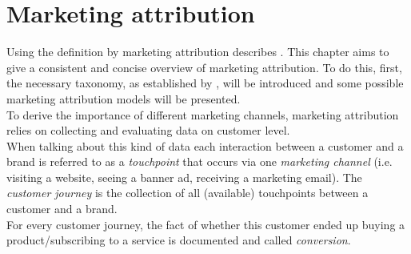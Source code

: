 \chapter{Marketing attribution}

Using the definition by \cite{buhalis-2021} marketing attribution describes . 
This chapter aims to give a consistent and concise overview of marketing attribution. To do this, first, the necessary taxonomy, as established by \cite{buhalis-2021}, will be introduced and some possible marketing attribution models will be presented.\\

To derive the importance of different marketing channels, marketing attribution relies on collecting and evaluating data on customer level.\\ 
When talking about this kind of data each interaction between a customer and a brand is referred to as a \textit{touchpoint} that occurs via one \textit{marketing channel} (i.e. visiting a website, seeing a banner ad, receiving a marketing email). The \textit{customer journey} is the collection of all (available) touchpoints between a customer and a brand. \\ 
For every customer journey, the fact of whether this customer ended up buying a product/subscribing to a service is documented and called \textit{conversion}.\\


